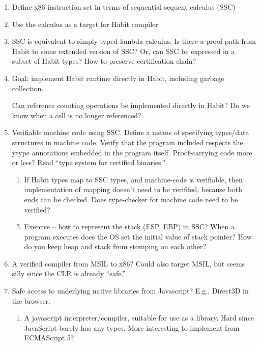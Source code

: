 \documentclass[11pt]{article}
\begin{document}
\begin{enumerate}
\item Define x86 instruction set in terms of sequential sequent calculus (SSC)

\item Use the calculus as a target for Habit compiler

\item SSC is equivalent to simply-typed lambda calculus. Is there a
  proof path from Habit to some extended version of SSC? Or,
  can SSC be expressed in a subset of Habit types? How to
  preserve certification chain?

\item Goal: implement Habit runtime directly in Habit, 
  including garbage collection. 
  
  Can reference counting operations
  be implemented directly in Habit? Do we know when a cell is no
  longer referenced?

\item Verifiable machine code using SSC. Define a means of specifying
  types/data structures in machine code. Verify that the program
  included respects the ytype annotations embedded in the program
  itself.  Proof-carrying code more or less?  Read ``type system for
  certified binaries.''
  
  \begin{enumerate}
    \item If Habit types map to SSC types, and machine-code is
      verifiable, then implementation of mapping doesn't need to be
      verififed, because both ends can be checked. Does type-checker
      for machine code need to be verified?
    \item Exercise -- how to represent the stack (ESP, EBP) in SSC?
      When a program executes does the OS set the initial value of
      stack pointer? How do you keep heap and stack from stomping on
      each other?
  \end{enumerate}
  
\item A verified compiler from MSIL to x86? Could also target MSIL, but seems silly
  since the CLR is already ``safe.''

\item Safe access to underlying native libraries from Javascript? E.g., Direct3D in
  the browser.
  \begin{enumerate}
  \item A javascript interpreter/compiler, suitable for use as a library. Hard since JavaScript
    barely has any types. More interesting to implement from ECMAScript 5?
  \end{enumerate}


\end{enumerate}
\end{document}
